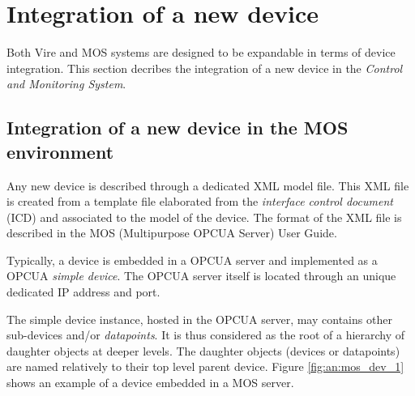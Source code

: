 
\section{Integration of a new device}\label{app:new_device}

Both Vire  and MOS systems are  designed to be expandable  in terms of
device integration.  This section  decribes the  integration of  a new
device in the \emph{Control and Monitoring System}.

\subsection{Integration of a new device in the MOS environment}

Any new device is described through  a dedicated XML model file.  This
XML  file  is  created  from  a  template  file  elaborated  from  the
\emph{interface control document} (ICD) and associated to the model of
the  device. The  format  of the  XML  file is  described  in the  MOS
(Multipurpose OPCUA Server) User Guide. %

Typically, a device is embedded in a OPCUA server and implemented as a
OPCUA  \emph{simple  device}.   The  OPCUA server  itself  is  located
through an unique dedicated IP address and port.

The simple device  instance, hosted in the OPCUA  server, may contains
other sub-devices and/or \emph{datapoints}.   It is thus considered as
the root  of a hierarchy  of daughter  objects at deeper  levels.  The
daughter objects (devices or datapoints) are named relatively to their
top level  parent device. Figure  \ref{fig:an:mos_dev_1} shows an
example of a device embedded in a MOS server.

